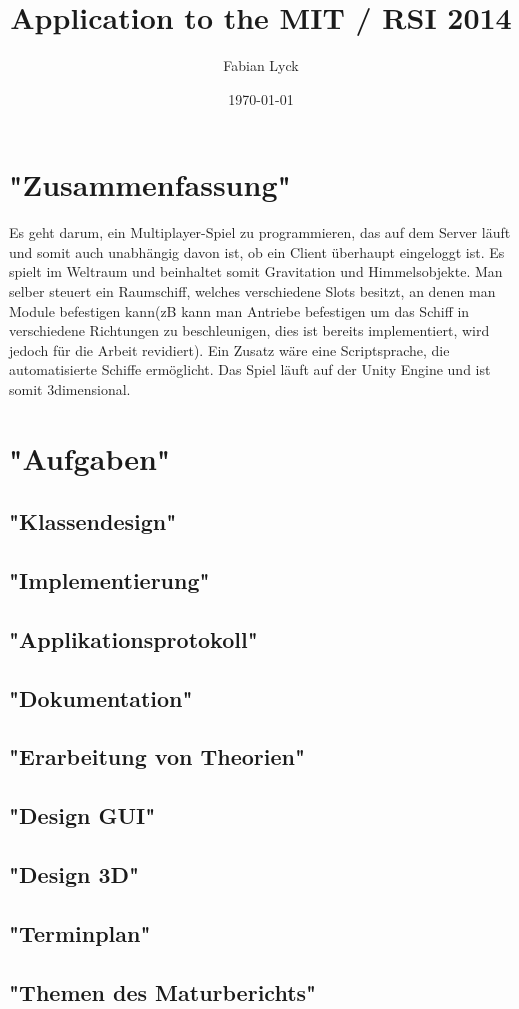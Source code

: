 \documentclass[8pt,a4paper]{article}
\title {Application to the MIT / RSI 2014}
\author {Fabian Lyck}
\date {\today}
\begin{document}
\section{"Zusammenfassung"}
Es geht darum, ein Multiplayer-Spiel zu programmieren, das auf dem Server läuft und somit auch unabhängig davon ist, ob ein Client überhaupt eingeloggt ist. Es spielt im Weltraum und beinhaltet somit Gravitation und Himmelsobjekte. Man selber steuert ein Raumschiff, welches verschiedene Slots besitzt, an denen man Module befestigen kann(zB kann man Antriebe befestigen um das Schiff in verschiedene Richtungen zu beschleunigen, dies ist bereits implementiert, wird jedoch für die Arbeit revidiert). Ein Zusatz wäre eine Scriptsprache, die automatisierte Schiffe ermöglicht. Das Spiel läuft auf der Unity Engine und ist somit 3dimensional.
\section{"Aufgaben"}
\subsection{"Klassendesign"}
\subsection{"Implementierung"}
\subsection{"Applikationsprotokoll"}
\subsection{"Dokumentation"}
\subsection{"Erarbeitung von Theorien"}
\subsection{"Design GUI"}
\subsection{"Design 3D"}
\subsection{"Terminplan"}
\subsection{"Themen des Maturberichts"}
\end{document}
